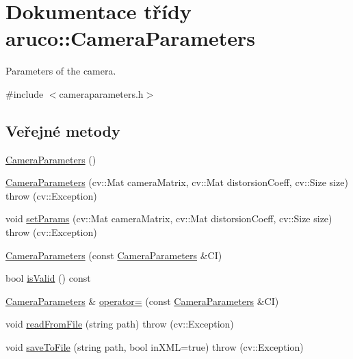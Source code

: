 \hypertarget{classaruco_1_1_camera_parameters}{\section{Dokumentace třídy aruco\-:\-:Camera\-Parameters}
\label{d6/d88/classaruco_1_1_camera_parameters}
}


Parameters of the camera.  




{\ttfamily \#include $<$cameraparameters.\-h$>$}

\subsection*{Veřejné metody}
\begin{DoxyCompactItemize}
\item 
\hyperlink{classaruco_1_1_camera_parameters_a23e30ef777f22f819a332592bf3db075}{Camera\-Parameters} ()
\item 
\hyperlink{classaruco_1_1_camera_parameters_a8abee4cd106b36900f0860b39ea7ef2a}{Camera\-Parameters} (cv\-::\-Mat camera\-Matrix, cv\-::\-Mat distorsion\-Coeff, cv\-::\-Size size)  throw (cv\-::\-Exception)
\item 
void \hyperlink{classaruco_1_1_camera_parameters_af51ad02ac8a968ed20161baa18ca6435}{set\-Params} (cv\-::\-Mat camera\-Matrix, cv\-::\-Mat distorsion\-Coeff, cv\-::\-Size size)  throw (cv\-::\-Exception)
\item 
\hyperlink{classaruco_1_1_camera_parameters_a9f9c0c3a68c29f3f5dd2b718de5217e1}{Camera\-Parameters} (const \hyperlink{classaruco_1_1_camera_parameters}{Camera\-Parameters} \&C\-I)
\item 
bool \hyperlink{classaruco_1_1_camera_parameters_ac3c1dde80f97886a1dc04c0439959596}{is\-Valid} () const 
\item 
\hyperlink{classaruco_1_1_camera_parameters}{Camera\-Parameters} \& \hyperlink{classaruco_1_1_camera_parameters_a4c13267368caccb7d05e79769460e1b3}{operator=} (const \hyperlink{classaruco_1_1_camera_parameters}{Camera\-Parameters} \&C\-I)
\item 
void \hyperlink{classaruco_1_1_camera_parameters_a65062b40124245d0386a365189ce86bc}{read\-From\-File} (string path)  throw (cv\-::\-Exception)
\item 
void \hyperlink{classaruco_1_1_camera_parameters_a0fb7e36dcc255b6d8f6cb191bf5bb635}{save\-To\-File} (string path, bool in\-X\-M\-L=true)  throw (cv\-::\-Exception)
\item 

\end{DoxyCompactItemize}
